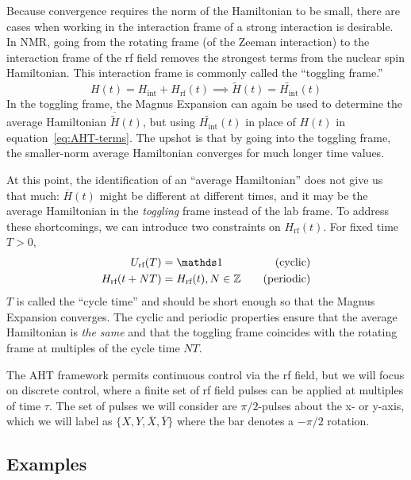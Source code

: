 Because convergence requires the norm of the Hamiltonian to be small, there are cases when working in the interaction frame of a strong interaction is desirable. In NMR, going from the rotating frame (of the Zeeman interaction) to the interaction frame of the rf field removes the strongest terms from the nuclear spin Hamiltonian. This interaction frame is commonly called the ``toggling frame.''
\[
H(t) = H_{\text{int}} + H_{\text{rf}}(t) \implies \widetilde{H}(t) = \widetilde{H_{\text{int}}}(t)
\]
In the toggling frame, the Magnus Expansion can again be used to determine the average Hamiltonian $\overline{\widetilde{H}}(t)$, but using $\widetilde{H_{\text{int}}}(t)$ in place of $H(t)$ in equation~\ref{eq:AHT-terms}. The upshot is that by going into the toggling frame, the smaller-norm average Hamiltonian converges for much longer time values.


At this point, the identification of an ``average Hamiltonian'' does not give us that much: $\overline{H}(t)$ might be different at different times, and it may be the average Hamiltonian in the \emph{toggling} frame instead of the lab frame. To address these shortcomings, we can introduce two constraints on $H_\text{rf}(t)$. For fixed time $T>0$,
\begin{align}\label{eq:AHT-constraints}
    U_{\text{rf}}(T) &= \identity & \quad \text{(cyclic)} \\
    H_{\text{rf}}(t + NT) &= H_{\text{rf}}(t), N \in \Z & \quad \text{(periodic)}
\end{align}
$T$ is called the ``cycle time'' and should be short enough so that the Magnus Expansion converges.
The cyclic and periodic properties ensure that the average Hamiltonian is \emph{the same} and that the toggling frame coincides with the rotating frame at multiples of the cycle time $NT$.

The AHT framework permits continuous control via the rf field, but we will focus on discrete control, where a finite set of rf field pulses can be applied at multiples of time $\tau$. The set of pulses we will consider are $\pi/2$-pulses about the x- or y-axis, which we will label as $\{ X, Y, \overline{X}, \overline{Y} \}$ where the bar denotes a $-\pi/2$ rotation.

\subsection{Examples}

